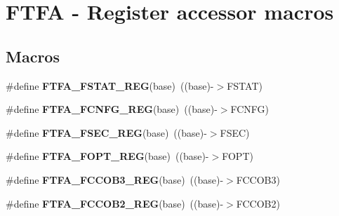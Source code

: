 \hypertarget{group___f_t_f_a___register___accessor___macros}{}\section{F\+T\+FA -\/ Register accessor macros}
\label{group___f_t_f_a___register___accessor___macros}
\subsection*{Macros}
\begin{DoxyCompactItemize}
\item 
\mbox{\label{group___f_t_f_a___register___accessor___macros_gaad0267e22158cd021a6d1ffb35879c81}} 
\#define {\bfseries F\+T\+F\+A\+\_\+\+F\+S\+T\+A\+T\+\_\+\+R\+EG}(base)~((base)-\/$>$F\+S\+T\+AT)
\item 
\mbox{\label{group___f_t_f_a___register___accessor___macros_ga7a3092fe2c55e49fdf56c4e3c93bc643}} 
\#define {\bfseries F\+T\+F\+A\+\_\+\+F\+C\+N\+F\+G\+\_\+\+R\+EG}(base)~((base)-\/$>$F\+C\+N\+FG)
\item 
\mbox{\label{group___f_t_f_a___register___accessor___macros_ga6f649f6743c50f29fd48ca36b219e82a}} 
\#define {\bfseries F\+T\+F\+A\+\_\+\+F\+S\+E\+C\+\_\+\+R\+EG}(base)~((base)-\/$>$F\+S\+EC)
\item 
\mbox{\label{group___f_t_f_a___register___accessor___macros_ga0036dc77c7d72aab7d4111ba8eb52d2f}} 
\#define {\bfseries F\+T\+F\+A\+\_\+\+F\+O\+P\+T\+\_\+\+R\+EG}(base)~((base)-\/$>$F\+O\+PT)
\item 
\mbox{\label{group___f_t_f_a___register___accessor___macros_gae685c7a7a80187d3c2d6f5404e5e3ebd}} 
\#define {\bfseries F\+T\+F\+A\+\_\+\+F\+C\+C\+O\+B3\+\_\+\+R\+EG}(base)~((base)-\/$>$F\+C\+C\+O\+B3)
\item 
\mbox{\label{group___f_t_f_a___register___accessor___macros_gafb84447c23c2c9ee77f894f846161b5d}} 
\#define {\bfseries F\+T\+F\+A\+\_\+\+F\+C\+C\+O\+B2\+\_\+\+R\+EG}(base)~((base)-\/$>$F\+C\+C\+O\+B2)

\end{DoxyCompactItemize}
